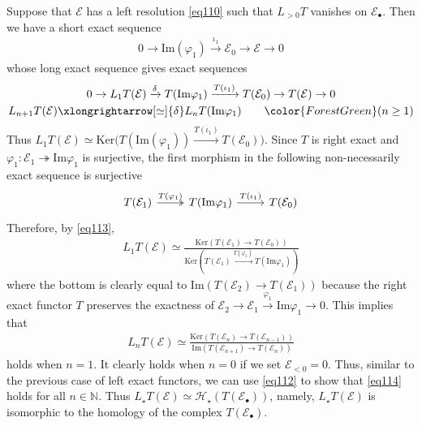 \documentclass[12pt,b5paper,notitlepage]{report}
\theoremstyle{definition}
\theoremstyle{plain}
\newcommand{\mc}{\mathcal}
\newcommand{\blt}{\bullet}
\newcommand{\Nbb}{\mathbb N}
\newcommand{\Ker}{\mathrm{Ker}}
\newcommand{\Imag}{\mathrm{Im}}
\numberwithin{equation}{section}
\begin{document}
Suppose that $\mc E$ has a left resolution \eqref{eq110} such that $L_{>0} T$ vanishes on $\mc E_\blt$. Then we have a short exact sequence
\begin{align*}
0\rightarrow\Imag(\varphi_1)\xrightarrow{\iota_1}\mc E_0\rightarrow\mc E\rightarrow0
\end{align*}
whose long exact sequence gives exact sequences
\begin{gather}
0\rightarrow L_1T(\mc E)\xrightarrow{\delta} T(\Imag\varphi_1)\xrightarrow{T(\iota_1)} T(\mc E_0)\rightarrow T(\mc E)\rightarrow0  \label{eq111}\\
L_{n+1}T(\mc E)\xlongrightarrow[\simeq]{\delta}L_nT(\Imag\varphi_1)\qquad {\color{ForestGreen}(n\geq 1)}  \label{eq112}
\end{gather}
Thus $L_1T(\mc E)\simeq\Ker\big(T(\Imag(\varphi_1))\xrightarrow{T(\iota_1)} T(\mc E_0)\big)$. Since $T$ is right exact and $\varphi_1:\mc E_1\twoheadrightarrow\Imag\varphi_1$ is surjective, the first morphism in the following non-necessarily exact sequence is surjective
\begin{equation*}
\begin{tikzcd}
T(\mc E_1)\arrow[r, two heads, "T(\varphi_1)"] & T(\Imag\varphi_1) \arrow[r, "T(\iota_1)"] & T(\mc E_0)
\end{tikzcd}
\end{equation*}
Therefore, by \eqref{eq113}, 
\begin{align*}
L_1T(\mc E)\simeq\frac{\Ker(T(\mc E_1)\rightarrow T(\mc E_0))}{\Ker(T(\mc E_1)\xrightarrow{T(\varphi_1)}T(\Imag\varphi_1))}
\end{align*}
where the bottom is clearly equal to $\Imag(T(\mc E_2)\rightarrow T(\mc E_1))$ because the right exact functor $T$ preserves the exactness of $\mc E_2\rightarrow\mc E_1\xrightarrow{\varphi_1} \Imag\varphi_1\rightarrow0$. This implies that
\begin{align}
L_nT(\mc E)\simeq\frac{\Ker(T(\mc E_n)\rightarrow T(\mc E_{n-1}))}{\Imag(T(\mc E_{n+1})\rightarrow T(\mc E_n))}  \label{eq114}
\end{align}
holds when $n=1$. It clearly holds when $n=0$ if we set $\mc E_{<0}=0$. Thus, similar to the previous case of left exact functors, we can use \eqref{eq112} to show that \eqref{eq114} holds for all $n\in\Nbb$. Thus {\color{Red}$L_\star T(\mc E)\simeq\mc H_\star(T(\mc E_\blt))$},  namely, $L_\star T(\mc E)$ is isomorphic to the homology of the complex $T(\mc E_\blt)$. 
\end{document}
